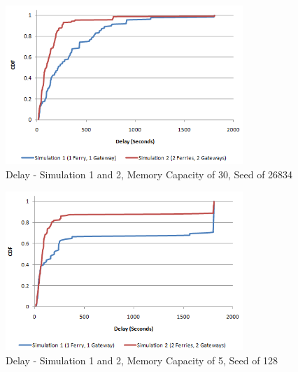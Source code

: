 \begin{figure}[htbp]
    \centering
    \includegraphics[width=0.8\textwidth]{images/result_delay_both_128_mc30}
    \caption{Delay - Simulation 1 and 2, Memory Capacity of 30, Seed of 26834}
    \label{fig:result_delay_both_128_mc30}
\end{figure}


\begin{figure}[htbp]
    \centering
    \includegraphics[width=0.8\textwidth]{images/result_delay_both_128_mc5}
    \caption{Delay - Simulation 1 and 2, Memory Capacity of 5, Seed of 128}
    \label{fig:result_delay_both_128_mc5}
\end{figure}